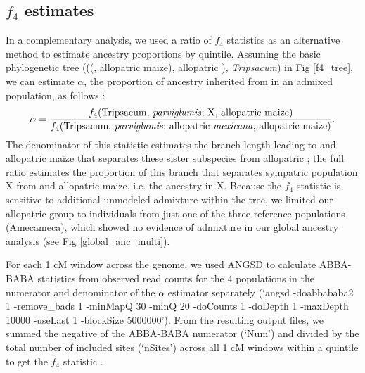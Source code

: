 \subsection*{$f_4$ estimates}
In a complementary analysis, we used a ratio of $f_4$ statistics as an alternative method to estimate ancestry proportions by quintile.   
Assuming the basic phylogenetic tree (((\parviglumis, allopatric maize), allopatric \mexicana), \textit{Tripsacum}) in Fig \ref{f4_tree}, we can estimate $\alpha$, the proportion of ancestry inherited from \mexicana in an admixed population, as follows \cite{Green:2010, Peter:2016}:
$$ \alpha = \frac{f_4(\text{Tripsacum, \parviglumis; X, allopatric maize})}{f_4(\text{Tripsacum, \parviglumis; allopatric \mexicana, allopatric maize)}}.$$
The denominator of this statistic estimates the branch length leading to \parviglumis and allopatric maize that separates these sister subspecies from allopatric \mexicana; the full ratio estimates the proportion of this branch that separates sympatric population X from \parviglumis and allopatric maize, i.e. the \mexicana ancestry in X. 
Because the $f_4$ statistic is sensitive to additional unmodeled admixture within the tree, we limited our allopatric \mexicana group to individuals from just one of the three reference populations (Amecameca), which showed no evidence of admixture in our global ancestry analysis (see Fig \ref{global_anc_multi}).

For each 1 cM window across the genome, we used ANGSD to calculate ABBA-BABA statistics from observed read counts for the 4 populations in the numerator and denominator of the $\alpha$ estimator separately (‘angsd -doabbababa2 1 -remove\_bads 1 -minMapQ 30 -minQ 20 -doCounts 1 -doDepth 1 -maxDepth 10000 -useLast 1 -blockSize 5000000').
From the resulting output files, we summed the negative of the ABBA-BABA numerator (‘Num') and divided by the total number of included sites (‘nSites') across all 1 cM windows within a quintile to get the $f_4$ statistic \cite{Soraggi:2018}. 

